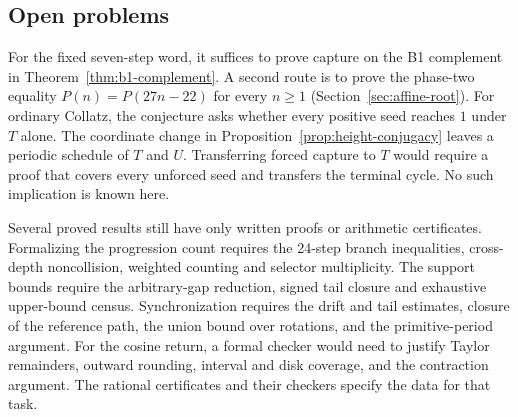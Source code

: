 \subsection{Open problems}

For the fixed seven-step word, it suffices to prove capture on the B1
complement in Theorem~\ref{thm:b1-complement}. A second route is to
prove the phase-two equality $P(n)=P(27n-22)$ for every $n\ge1$
(Section~\ref{sec:affine-root}). For ordinary Collatz, the conjecture
asks whether every positive seed reaches $1$ under $T$ alone. The
coordinate change in Proposition~\ref{prop:height-conjugacy} leaves a
periodic schedule of $T$ and $U$. Transferring forced capture to $T$
would require a proof that covers every unforced seed and transfers the
terminal cycle. No such implication is known here.

Several proved results still have only written proofs or arithmetic
certificates. Formalizing the progression count requires the 24-step
branch inequalities, cross-depth noncollision, weighted counting and
selector multiplicity. The support bounds require the arbitrary-gap
reduction, signed tail closure and exhaustive upper-bound census.
Synchronization requires the drift and tail estimates, closure of the
reference path, the union bound over rotations, and the primitive-period
argument. For the cosine return, a formal checker would need to justify
Taylor remainders, outward rounding, interval and disk coverage, and the
contraction argument. The rational certificates and their checkers
specify the data for that task.
